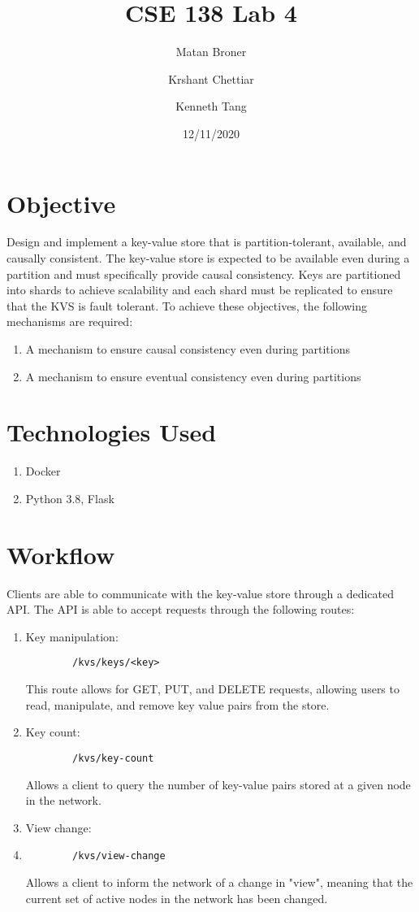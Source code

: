 \documentclass[12pt]{article}
\title{CSE 138 Lab 4}
\author{
  Matan Broner\\
  \and
  Krshant Chettiar\\
  \and 
  Kenneth Tang
}
\date{12/11/2020}
\begin{document}
\maketitle

\section{Objective}
Design and implement a key-value store that is partition-tolerant, available, and causally consistent. The key-value store is expected to be available even during a partition and must specifically provide causal consistency. Keys are partitioned into shards to achieve scalability and each shard must be replicated to ensure that the KVS is fault tolerant.
\newline
To achieve these objectives, the following mechanisms are required:
\begin{enumerate}
	\item A mechanism to ensure causal consistency even during partitions
	\item A mechanism to ensure eventual consistency even during partitions

\end{enumerate}

\section{Technologies Used}
\begin{enumerate}
	\item Docker
	\item Python 3.8, Flask
\end{enumerate}

\section{Workflow}
Clients are able to communicate with the key-value store through a dedicated API. The API is able to accept requests through the following routes:
\begin{enumerate}
	\item Key manipulation:
	\begin{verbatim}
		/kvs/keys/<key>
	\end{verbatim}
	This route allows for GET, PUT, and DELETE requests, allowing users to read, manipulate, and remove key value pairs from the store.
	\item Key count:
	\begin{verbatim}
		/kvs/key-count
	\end{verbatim}
	Allows a client to query the number of key-value pairs stored at a given node in the network.
	\item View change:
	\item \begin{verbatim}
		/kvs/view-change
	\end{verbatim}
	Allows a client to inform the network of a change in "view", meaning that the current set of active nodes in the network has been changed.
\end{enumerate}
\end{document}
